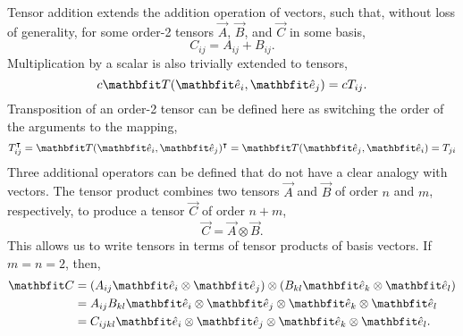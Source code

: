 Tensor addition extends the addition operation of vectors, such that, without loss of generality, for some order-2 tensors $\vec{A}$, $\vec{B}$, and $\vec{C}$ in some basis,
\begin{equation}
    C_{ij} = A_{ij} + B_{ij}.
\end{equation}
Multiplication by a scalar is also trivially extended to tensors,
\begin{equation}
    c \vec{T}(\unitvec_{i}, \unitvec_{j}) = cT_{ij}.
\end{equation}
Transposition of an order-2 tensor can be defined here as switching the order of the arguments to the mapping,
\begin{equation}
    T_{ij}^{\intercal} = \vec{T}(\unitvec_{i}, \unitvec_{j})^{\intercal} = \vec{T}(\unitvec_{j}, \unitvec_{i}) = T_{ji}
\end{equation}
Three additional operators can be defined that do not have a clear analogy with vectors.
The tensor product combines two tensors $\vec{A}$ and $\vec{B}$ of order $n$ and $m$, respectively, to produce a tensor $\vec{C}$ of order $n + m$,
\begin{equation}
    \vec{C} = \vec{A} \otimes \vec{B}.
\end{equation}
This allows us to write tensors in terms of tensor products of basis vectors.
If $m = n = 2$, then,
\begin{align}
    \vec{C} &= (A_{ij} \unitvec_{i} \otimes \unitvec_{j}) \otimes (B_{kl} \unitvec_{k} \otimes \unitvec_{l}) \nonumber\\
            &= A_{ij} B_{kl} \unitvec_{i} \otimes \unitvec_{j} \otimes \unitvec_{k} \otimes \unitvec_{l} \nonumber\\
            &= C_{ijkl} \unitvec_{i} \otimes \unitvec_{j} \otimes \unitvec_{k} \otimes \unitvec_{l}.
\end{align}

